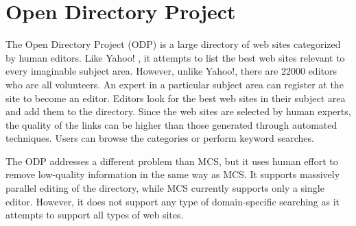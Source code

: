 \section{Open Directory Project}
The Open Directory Project (ODP) \cite{open-directory-website} is a large
directory of web sites categorized by human editors. Like Yahoo!
\cite{yahoo-website}, it attempts to list the best web sites relevant to every
imaginable subject area.  However, unlike Yahoo!, there are 22000 editors who
are all volunteers. An expert in a particular subject area can register at the
site to become an editor. Editors look for the best web sites in their subject
area and add them to the directory. Since the web sites are selected by human
experts, the quality of the links can be higher than those generated through
automated techniques.  Users can browse the categories or perform keyword
searches.

The ODP addresses a different problem than MCS, but it uses human effort to
remove low-quality information in the same way as MCS. It supports massively
parallel editing of the directory, while MCS currently supports only a single
editor. However, it does not support any type of domain-specific searching as
it attempts to support all types of web sites.

%


